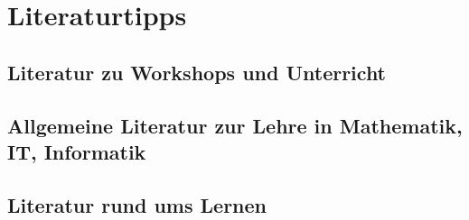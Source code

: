 \documentclass[a4paper,openany,twoside,titlepage,10pt,headsepline]{scrbook}
\begin{document}
    \chapter{Literaturtipps}


    \section{Literatur zu Workshops und Unterricht}
    \cite{moderationstechniken, visualisieren-praesentieren-moderieren, workshop-buch, treibhaeuser-der-zukunft}


    \section{Allgemeine Literatur zur Lehre in Mathematik, IT, Informatik}
    \cite{teaching-engineering, red-pen, it-trainer}


    \section{Literatur rund ums Lernen}
    \cite{denken-lernen-vergessen, lernen-zu-lernen}

    

    
\end{document}

